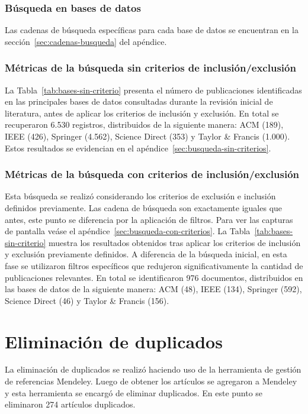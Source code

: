 \subsubsection{Búsqueda en bases de datos}\label{par:busquedaBasesDatos}
Las cadenas de búsqueda específicas para cada base de datos se encuentran en la sección~\ref{sec:cadenas-busqueda} del apéndice.

\subsubsection{Métricas de la búsqueda sin criterios de inclusión/exclusión}\label{subsubsec:resumenBusqueda}
La Tabla~\ref{tab:bases-sin-criterio} presenta el número de publicaciones identificadas en las principales bases de datos consultadas durante la revisión inicial de literatura, antes de aplicar los criterios de inclusión y exclusión. En total se recuperaron 6.530 registros, distribuidos de la siguiente manera: ACM (189), IEEE (426), Springer (4.562), Science Direct (353) y Taylor \& Francis (1.000). Estos resultados se evidencian en el apéndice~\ref{sec:busqueda-sin-criterios}.




\subsubsection{Métricas de la búsqueda con criterios de inclusión/exclusión}\label{subsec:resumenBusquedaCriterios}
Esta búsqueda se realizó considerando los criterios de exclusión e inclusión definidos previamente. Las cadena de búsqueda son exactamente iguales que antes, este punto se diferencia por la aplicación de filtros. Para ver las capturas de pantalla veáse el apéndice~\ref{sec:busqueda-con-criterios}.
La Tabla~\ref{tab:bases-sin-criterio} muestra los resultados obtenidos tras aplicar los criterios de inclusión y exclusión previamente definidos. A diferencia de la búsqueda inicial, en esta fase se utilizaron filtros específicos que redujeron significativamente la cantidad de publicaciones relevantes. En total se identificaron 976 documentos, distribuidos en las bases de datos de la siguiente manera: ACM (48), IEEE (134), Springer (592), Science Direct (46) y Taylor \& Francis (156).




\section{Eliminación de duplicados}\label{sec:eliminacionDuplicados}
La eliminación de duplicados se realizó haciendo uso de la herramienta de gestión de referencias Mendeley. Luego de obtener los artículos se agregaron a Mendeley y esta herramienta se encargó de eliminar duplicados. En este punto se eliminaron 274 artículos duplicados.

